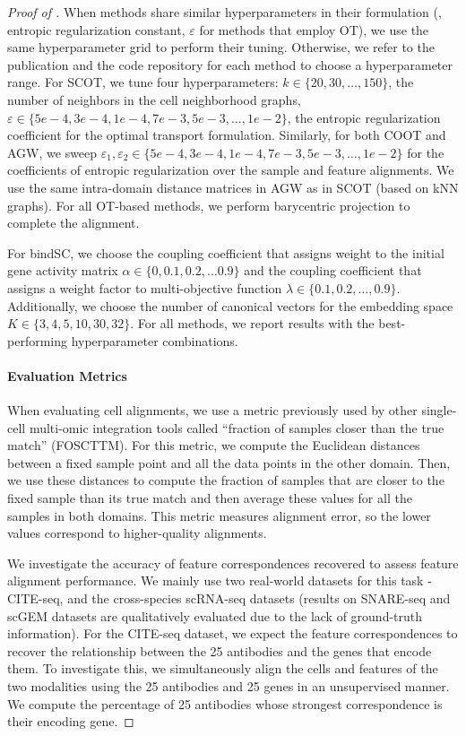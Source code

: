 \begin{proof}[Proof of ]
When methods share similar hyperparameters in their formulation (\eg,
entropic regularization constant, $\varepsilon$ for methods that employ OT),
we use the same hyperparameter grid to perform their tuning. Otherwise,
we refer to the publication and the code repository for each method to choose a hyperparameter range.
For SCOT, we tune four hyperparameters: $k \in \{20, 30, \dots, 150\}$, the number of neighbors
in the cell neighborhood graphs, $\varepsilon \in \{5e-4, 3e-4, 1e-4, 7e-3, 5e-3, \dots, 1e-2 \}$,
the entropic regularization coefficient for the optimal transport formulation. Similarly,
for both COOT and AGW, we sweep
$\varepsilon_1, \varepsilon_2 \in \{5e-4, 3e-4, 1e-4, 7e-3, 5e-3, \dots, 1e-2 \}$
for the coefficients of entropic regularization over the sample and feature alignments.
We use the same intra-domain distance matrices in AGW as in SCOT (based on kNN graphs).
For all OT-based methods, we perform barycentric projection to complete the alignment.

For bindSC, we choose the coupling coefficient that assigns weight to the
initial gene activity matrix $\alpha \in \{0, 0.1, 0.2, \dots 0.9\}$ and
the coupling coefficient that assigns a weight factor to multi-objective function
$\lambda \in \{0.1, 0.2, \dots, 0.9\}$. Additionally, we choose the number of canonical vectors
for the embedding space $K \in \{3, 4, 5, 10, 30, 32\}$.  For all methods,
we report results with the best-performing hyperparameter combinations.

\paragraph{Evaluation Metrics} When evaluating cell alignments, we use a metric previously used
by other single-cell multi-omic integration tools
\citep{liu_et_al:LIPIcs:2019:11040,singh20,cao2020unsupervised,Demetci20,Pamona,Demetci22,bindSC}
called ``fraction of samples closer than the true match'' (FOSCTTM). For this metric,
we compute the Euclidean distances between a fixed sample point and all the data points
in the other domain. Then, we use these distances to compute the fraction of samples
that are closer to the fixed sample than its true match and then average these values
for all the samples in both domains. This metric measures alignment error, so the lower values
correspond to higher-quality alignments.

We investigate the accuracy of feature correspondences recovered to assess feature alignment
performance. We mainly use two real-world datasets for this task - CITE-seq,
and the cross-species scRNA-seq datasets (results on SNARE-seq and scGEM datasets
are qualitatively evaluated due to the lack of ground-truth information). For the CITE-seq dataset,
we expect the feature correspondences to recover the relationship between the 25 antibodies
and the genes that encode them. To investigate this, we simultaneously align the cells and
features of the two modalities using the 25 antibodies and 25 genes in an unsupervised manner.
We compute the percentage of 25 antibodies whose strongest correspondence is their encoding gene.


\end{proof}
